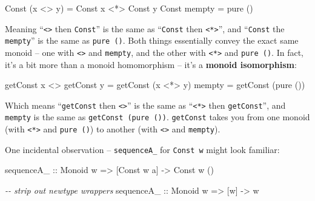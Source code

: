 \documentclass[]{article}
\newenvironment{Shaded}{}{}
\newcommand{\CommentTok}[1]{\textcolor[rgb]{0.38,0.63,0.69}{\textit{#1}}}
\newcommand{\DataTypeTok}[1]{\textcolor[rgb]{0.56,0.13,0.00}{#1}}
\newcommand{\FunctionTok}[1]{\textcolor[rgb]{0.02,0.16,0.49}{#1}}
\newcommand{\NormalTok}[1]{#1}
\newcommand{\OperatorTok}[1]{\textcolor[rgb]{0.40,0.40,0.40}{#1}}
\newcommand{\OtherTok}[1]{\textcolor[rgb]{0.00,0.44,0.13}{#1}}
\begin{document}
\begin{Shaded}
\begin{Highlighting}[]
\DataTypeTok{Const}\NormalTok{ (x }\OperatorTok{\textless{}\textgreater{}}\NormalTok{ y) }\OtherTok{=} \DataTypeTok{Const}\NormalTok{ x }\OperatorTok{\textless{}*\textgreater{}} \DataTypeTok{Const}\NormalTok{ y}
\DataTypeTok{Const} \FunctionTok{mempty}   \OtherTok{=} \FunctionTok{pure}\NormalTok{ ()}
\end{Highlighting}
\end{Shaded}

Meaning ``\texttt{\textless{}\textgreater{}} then \texttt{Const}'' is the same
as ``\texttt{Const} then \texttt{\textless{}*\textgreater{}}'', and
``\texttt{Const} the \texttt{mempty}'' is the same as \texttt{pure\ ()}. Both
things essentially convey the exact same monoid -- one with
\texttt{\textless{}\textgreater{}} and \texttt{mempty}, and the other with
\texttt{\textless{}*\textgreater{}} and \texttt{pure\ ()}. In fact, it's a bit
more than a monoid homomorphism -- it's a \textbf{monoid isomorphism}:

\begin{Shaded}
\begin{Highlighting}[]
\NormalTok{getConst x }\OperatorTok{\textless{}\textgreater{}}\NormalTok{ getConst y }\OtherTok{=}\NormalTok{ getConst (x }\OperatorTok{\textless{}*\textgreater{}}\NormalTok{ y)}
\FunctionTok{mempty}                   \OtherTok{=}\NormalTok{ getConst (}\FunctionTok{pure}\NormalTok{ ())}
\end{Highlighting}
\end{Shaded}

Which means ``\texttt{getConst} then \texttt{\textless{}\textgreater{}}'' is the
same as ``\texttt{\textless{}*\textgreater{}} then \texttt{getConst}'', and
\texttt{mempty} is the same as \texttt{getConst\ (pure\ ())}. \texttt{getConst}
takes you from one monoid (with \texttt{\textless{}*\textgreater{}} and
\texttt{pure\ ()}) to another (with \texttt{\textless{}\textgreater{}} and
\texttt{mempty}).

One incidental observation -- \texttt{sequenceA\_} for \texttt{Const\ w} might
look familiar:

\begin{Shaded}
\begin{Highlighting}[]
\OtherTok{sequenceA\_ ::} \DataTypeTok{Monoid}\NormalTok{ w }\OtherTok{=\textgreater{}}\NormalTok{ [}\DataTypeTok{Const}\NormalTok{ w a] }\OtherTok{{-}\textgreater{}} \DataTypeTok{Const}\NormalTok{ w ()}

\CommentTok{{-}{-} strip out newtype wrappers}
\OtherTok{sequenceA\_ ::} \DataTypeTok{Monoid}\NormalTok{ w }\OtherTok{=\textgreater{}}\NormalTok{ [w] }\OtherTok{{-}\textgreater{}}\NormalTok{ w}
\end{Highlighting}
\end{Shaded}
\end{document}
